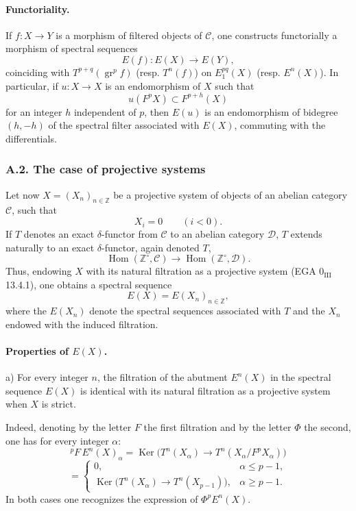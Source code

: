 \documentclass[11pt]{article}
\DeclareMathOperator{\Hom}{Hom}
\providecommand{\Ker}{\operatorname{Ker}}
\providecommand{\gr}{\operatorname{gr}}
\providecommand{\Hom}{\operatorname{Hom}}
\providecommand{\Ker}{\operatorname{Ker}}
\providecommand{\gr}{\operatorname{gr}}
\providecommand{\gr}{\operatorname{gr}}
\providecommand{\Ker}{\operatorname{Ker}}
\begin{document}
\paragraph{Functoriality.}
If \(f:X\to Y\) is a morphism of filtered objects of \(\mathcal C\), one constructs functorially a morphism of spectral sequences
\[
E(f):E(X)\longrightarrow E(Y),
\]
coinciding with \(T^{p+q}(\gr^p f)\) (resp. \(T^n(f)\)) on \(E_1^{pq}(X)\) (resp. \(E^n(X)\)). In particular, if \(u:X\to X\) is an endomorphism of \(X\) such that
\[
u(F^pX)\subset F^{p+h}(X)
\]
for an integer \(h\) independent of \(p\), then \(E(u)\) is an endomorphism of bidegree \((h,-h)\) of the spectral filter associated with \(E(X)\), commuting with the differentials.

\subsubsection*{A.2. The case of projective systems}
Let now \(X=(X_n)_{n\in\mathbb Z}\) be a projective system of objects of an abelian category \(\mathcal C\), such that
\[
X_i=0\qquad(i<0).
\]
If \(T\) denotes an exact \(\delta\)-functor from \(\mathcal C\) to an abelian category \(\mathcal D\), \(T\) extends naturally to an exact \(\delta\)-functor, again denoted \(T\),
\[
\Hom(\mathbb Z^\circ,\mathcal C)\longrightarrow \Hom(\mathbb Z^\circ,\mathcal D).
\]
Thus, endowing \(X\) with its natural filtration as a projective system (EGA \(0_{\mathrm{III}}\) 13.4.1), one obtains a spectral sequence
\[
E(X)=E(X_n)_{n\in\mathbb Z},
\]
where the \(E(X_n)\) denote the spectral sequences associated with \(T\) and the \(X_n\) endowed with the induced filtration.

\paragraph{Properties of \(E(X)\).}
a) For every integer \(n\), the filtration of the abutment \(E^n(X)\) in the spectral sequence \(E(X)\) is identical with its natural filtration as a projective system when \(X\) is strict.

Indeed, denoting by the letter \(F\) the first filtration and by the letter \(\Phi\) the second, one has for every integer \(\alpha\):
\[
{}^pF\,E^n(X)_\alpha
=\Ker\bigl(T^n(X_\alpha)\longrightarrow T^n(X_\alpha/F^pX_\alpha)\bigr)
\]
\[
=
\begin{cases}
0,& \alpha\le p-1,\\
\Ker\bigl(T^n(X_\alpha)\longrightarrow T^n(X_{p-1})\bigr),& \alpha\ge p-1.
\end{cases}
\]
In both cases one recognizes the expression of \(\Phi^pE^n(X)\).
\end{document}
